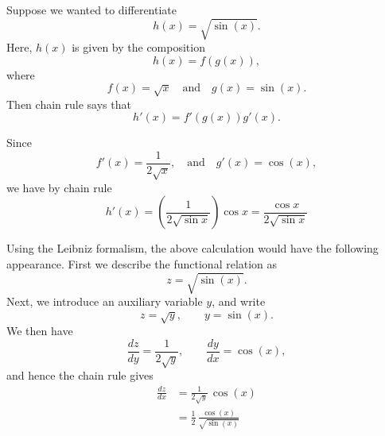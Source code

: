 \documentclass[12pt]{article}
\begin{document}
Suppose we wanted to differentiate 
$$h(x)=\sqrt{\sin(x)}.$$
Here, $h(x)$ is given by the composition 
$$h(x)=f(g(x)),$$
where
$$f(x)=\sqrt{x}\quad\mbox{and}\quad g(x)=\sin(x).$$
Then chain rule
says that 
$$h'(x)=f'(g(x))g'(x).$$

Since
$$f'(x)=\frac{1}{2\sqrt{x}},\quad\mbox{and}\quad
g'(x)=\cos(x),$$
we have by chain rule
$$h'(x) = \left(\frac{1}{2\sqrt{\sin x}}\right)\cos x=\frac{\cos
  x}{2\sqrt{\sin 
x}}$$

Using the Leibniz formalism, the above calculation would have the
following appearance.  First we describe the functional relation as
$$z = \sqrt{\sin(x)}.$$
Next, we introduce an auxiliary variable $y$, and write
$$z= \sqrt{y},\qquad y=\sin(x).$$
We then have
$$\frac{dz}{dy} = \frac{1}{2\sqrt{y}},\qquad \frac{dy}{dx} =
\cos(x),$$
and hence the chain rule gives
\begin{align*}
\frac{dz}{dx} &= \frac{1}{2\sqrt{y}}\, \cos(x) \\
&= \frac{1}{2}\,\frac{\cos(x)}{\sqrt{\sin(x)}}
\end{align*}
\end{document}
